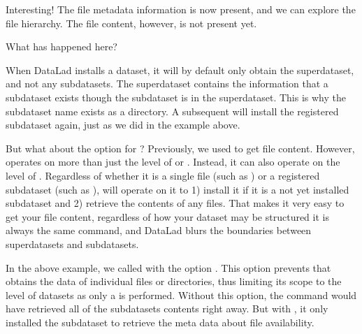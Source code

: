 \sphinxAtStartPar
Interesting! The file metadata information is now present, and we can
explore the file hierarchy. The file content, however, is not present yet.

\sphinxAtStartPar
What has happened here?

\sphinxAtStartPar
When DataLad installs a dataset, it will by default only obtain the
superdataset, and not any subdatasets. The superdataset contains the
information that a subdataset exists though \textendash{} the subdataset is 
in the superdataset.  This is why the subdataset name exists as a directory.
A subsequent  will install the registered
subdataset again, just as we did in the example above.

\sphinxAtStartPar
But what about the  option for ?
Previously, we used  to get file content. However,
 operates on more than just the level of  or .
Instead, it can also operate on the level of . Regardless of whether
it is a single file (such as ) or a registered subdataset
(such as ),  will operate on it to 1) install
it \textendash{} if it is a not yet installed subdataset \textendash{} and 2) retrieve the contents of any files.
That makes it very easy to get your file content, regardless of
how your dataset may be structured \textendash{} it is always the same command, and DataLad
blurs the boundaries between superdatasets and subdatasets.

\sphinxAtStartPar
In the above example, we called  with the option .
This option prevents that  obtains the data of individual files or
directories, thus limiting its scope to the level of datasets as only a
 is performed. Without this option, the command would
have retrieved all of the subdatasets contents right away. But with ,
it only installed the subdataset to retrieve the meta data about file availability.

